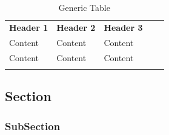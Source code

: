 \begin{table}[H]
\caption[The caption that goes into the list of tables]{Generic Table}
\label{tab:name the table for cross reference}
\centering
\begin{tabular}{lllll}
\cline{1-3}
\multicolumn{1}{|c|}{\cellcolor[HTML]{C0C0C0}\textbf{Header 1}} & \multicolumn{1}{c|}{\cellcolor[HTML]{C0C0C0}\textbf{Header 2}} & \multicolumn{1}{c|}{\cellcolor[HTML]{C0C0C0}\textbf{Header 3}} &  &  \\ \cline{1-3}
\multicolumn{1}{|l|}{Content}                                   & \multicolumn{1}{l|}{Content}                                   & \multicolumn{1}{l|}{Content}                                   &  &  \\ \cline{1-3}
\multicolumn{1}{|l|}{Content}                                   & \multicolumn{1}{l|}{Content}                                   & \multicolumn{1}{l|}{Content}                                   &  &  \\ \cline{1-3}
                                                                &                                                                &                                                                &  & 
\end{tabular}
\end{table}


\subsection{Section}
\blindtext

\subsubsection{SubSection}
\blindtext